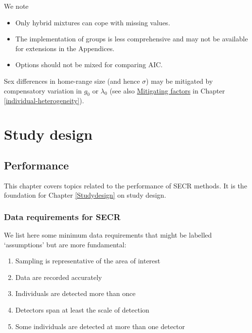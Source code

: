 \documentclass[
]{book}
\providecommand{\tightlist}{%
  \setlength{\itemsep}{0pt}\setlength{\parskip}{0pt}}
\begin{document}
We note

\begin{itemize}
\tightlist
\item
  Only hybrid mixtures can cope with missing values.
\item
  The implementation of groups is less comprehensive and may not be available for extensions in the Appendices.
\item
  Options should not be mixed for comparing AIC.
\end{itemize}

Sex differences in home-range size (and hence \(\sigma\)) may be mitigated by compensatory variation in \(g_0\) or \(\lambda_0\) \citep{em14} (see also \hyperref[mitigation]{Mitigating factors} in Chapter \ref{individual-heterogeneity}).

\part*{Study design}\label{part-study-design}

\chapter{Performance}\label{Performance}

This chapter covers topics related to the performance of SECR methods. It is the foundation for Chapter \ref{Studydesign} on study design.

\section{Data requirements for SECR}\label{datarequirements}

We list here some minimum data requirements that might be labelled `assumptions' but are more fundamental:

\begin{enumerate}
\def\labelenumi{\arabic{enumi}.}
\tightlist
\item
  Sampling is representative of the area of interest
\item
  Data are recorded accurately
\item
  Individuals are detected more than once
\item
  Detectors span at least the scale of detection
\item
  Some individuals are detected at more than one detector
\end{enumerate}
\end{document}
